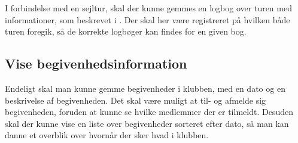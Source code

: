 I forbindelse med en sejltur, skal der kunne gemmes en logbog over turen med informationer, som beskrevet i .
Der skal her være registreret på hvilken både turen foregik, så de korrekte logbøger kan findes for en given bog.

\subsection{Vise begivenhedsinformation}

Endeligt skal man kunne gemme begivenheder i klubben, med en dato og en beskrivelse af begivenheden. 
Det skal være muligt at til- og afmelde sig begivenheden, foruden at kunne se hvilke medlemmer der er tilmeldt.
Desuden skal der kunne vise en liste over begivenheder sorteret efter dato, så man kan danne et overblik over hvornår der sker hvad i klubben.
